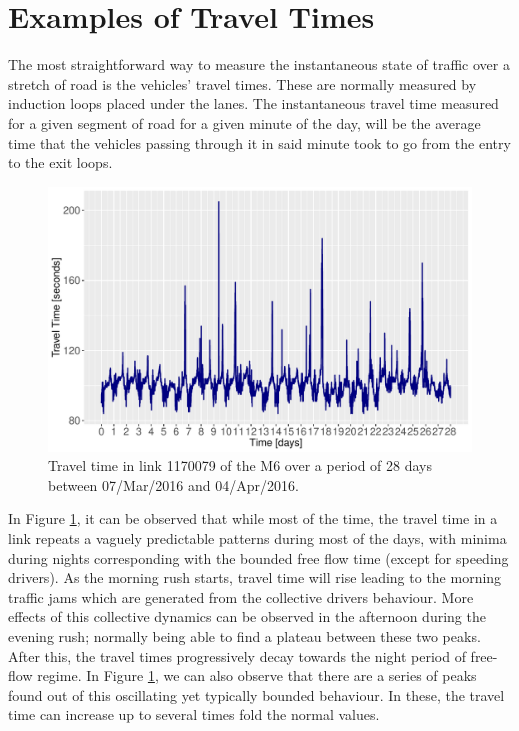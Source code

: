 \documentclass[letterpaper, 10 pt, conference]{ieeeconf}  %
\begin{document}
\section{Examples of Travel Times} \label{Examples of Travel Times}
The most straightforward way to measure the instantaneous state of traffic over a stretch of road is the vehicles' travel times. 
These are normally measured by induction loops placed under the lanes. 
The instantaneous travel time measured for a given segment of road for a given minute of the day, will be the average time that the vehicles passing through it in said minute took to go from the entry to the exit loops.
\begin{figure}[htbp]
\centerline{\includegraphics[width=\linewidth]{./images/Travel_Time.pdf}}
\caption{Travel time in link 1170079 of the M6 over a period of 28 days between 07/Mar/2016 and 04/Apr/2016.}
\label{fig:travel_time}
\end{figure}
In Figure \ref{fig:travel_time}, it can be observed that while most of the time, the travel time in a link repeats a vaguely predictable patterns during most of the days, with minima during nights corresponding with the bounded free flow time (except for speeding drivers).
As the morning rush starts, travel time will rise leading to the morning traffic jams which are generated from the collective drivers behaviour.
More effects of this collective dynamics can be observed in the afternoon during the evening rush; normally being able to find a plateau between these two peaks.
After this, the travel times progressively decay towards the night period of free-flow regime.
In Figure \ref{fig:travel_time}, we can also observe that there are a series of peaks found out of this oscillating yet typically bounded behaviour. 
In these, the travel time can increase up to several times fold the normal values.
\end{document}
